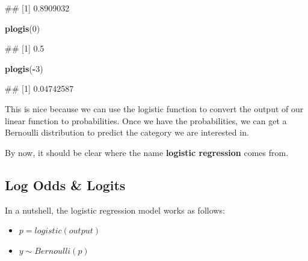 \documentclass[
]{book}
\newenvironment{Shaded}{\begin{snugshade}}{\end{snugshade}}
\newcommand{\DecValTok}[1]{\textcolor[rgb]{0.00,0.00,0.81}{#1}}
\newcommand{\FunctionTok}[1]{\textcolor[rgb]{0.13,0.29,0.53}{\textbf{#1}}}
\newcommand{\NormalTok}[1]{#1}
\newcommand{\SpecialCharTok}[1]{\textcolor[rgb]{0.81,0.36,0.00}{\textbf{#1}}}
\providecommand{\tightlist}{%
  \setlength{\itemsep}{0pt}\setlength{\parskip}{0pt}}
\begin{document}
\begin{Shaded}
\begin{Highlighting}[]
\NormalTok{\#\# [1] 0.8909032}
\end{Highlighting}
\end{Shaded}

\begin{Shaded}
\begin{Highlighting}[]
\FunctionTok{plogis}\NormalTok{(}\DecValTok{0}\NormalTok{)}
\end{Highlighting}
\end{Shaded}

\begin{Shaded}
\begin{Highlighting}[]
\NormalTok{\#\# [1] 0.5}
\end{Highlighting}
\end{Shaded}

\begin{Shaded}
\begin{Highlighting}[]
\FunctionTok{plogis}\NormalTok{(}\SpecialCharTok{{-}}\DecValTok{3}\NormalTok{)}
\end{Highlighting}
\end{Shaded}

\begin{Shaded}
\begin{Highlighting}[]
\NormalTok{\#\# [1] 0.04742587}
\end{Highlighting}
\end{Shaded}

This is nice because we can use the logistic function to convert the output of our linear function to probabilities. Once we have the probabilities, we can get a Bernoulli distribution to predict the category we are interested in.

By now, it should be clear where the name \textbf{logistic regression} comes from.

\subsection{Log Odds \& Logits}\label{log-odds-logits}

In a nutshell, the logistic regression model works as follows:

\begin{itemize}
\tightlist
\item
  \(p = logistic(output)\)
\item
  \(y \sim Bernoulli(p)\)
\end{itemize}
\end{document}
